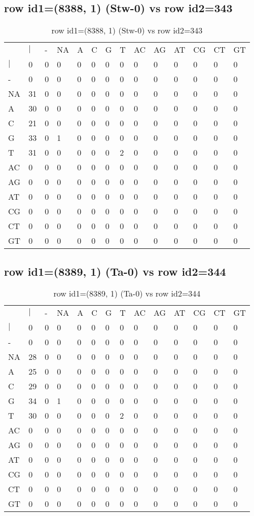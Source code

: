 \subsection{row id1=(8388, 1) (Stw-0) vs row id2=343}
\begin{center}
\begin{longtable}{|l|l|l|l|l|l|l|l|l|l|l|l|l|l|}
\caption{row id1=(8388, 1) (Stw-0) vs row id2=343} \label{table_dm444}\\
\hline
\\
\hline
&$|$&-&NA&A&C&G&T&AC&AG&AT&CG&CT&GT\\
$|$&0&0&0&0&0&0&0&0&0&0&0&0&0\\
-&0&0&0&0&0&0&0&0&0&0&0&0&0\\
NA&31&0&0&0&0&0&0&0&0&0&0&0&0\\
A&30&0&0&0&0&0&0&0&0&0&0&0&0\\
C&21&0&0&0&0&0&0&0&0&0&0&0&0\\
G&33&0&1&0&0&0&0&0&0&0&0&0&0\\
T&31&0&0&0&0&0&2&0&0&0&0&0&0\\
AC&0&0&0&0&0&0&0&0&0&0&0&0&0\\
AG&0&0&0&0&0&0&0&0&0&0&0&0&0\\
AT&0&0&0&0&0&0&0&0&0&0&0&0&0\\
CG&0&0&0&0&0&0&0&0&0&0&0&0&0\\
CT&0&0&0&0&0&0&0&0&0&0&0&0&0\\
GT&0&0&0&0&0&0&0&0&0&0&0&0&0\\
\hline
\end{longtable}
\end{center}

\subsection{row id1=(8389, 1) (Ta-0) vs row id2=344}
\begin{center}
\begin{longtable}{|l|l|l|l|l|l|l|l|l|l|l|l|l|l|}
\caption{row id1=(8389, 1) (Ta-0) vs row id2=344} \label{table_dm446}\\
\hline
\\
\hline
&$|$&-&NA&A&C&G&T&AC&AG&AT&CG&CT&GT\\
$|$&0&0&0&0&0&0&0&0&0&0&0&0&0\\
-&0&0&0&0&0&0&0&0&0&0&0&0&0\\
NA&28&0&0&0&0&0&0&0&0&0&0&0&0\\
A&25&0&0&0&0&0&0&0&0&0&0&0&0\\
C&29&0&0&0&0&0&0&0&0&0&0&0&0\\
G&34&0&1&0&0&0&0&0&0&0&0&0&0\\
T&30&0&0&0&0&0&2&0&0&0&0&0&0\\
AC&0&0&0&0&0&0&0&0&0&0&0&0&0\\
AG&0&0&0&0&0&0&0&0&0&0&0&0&0\\
AT&0&0&0&0&0&0&0&0&0&0&0&0&0\\
CG&0&0&0&0&0&0&0&0&0&0&0&0&0\\
CT&0&0&0&0&0&0&0&0&0&0&0&0&0\\
GT&0&0&0&0&0&0&0&0&0&0&0&0&0\\
\hline
\end{longtable}
\end{center}

